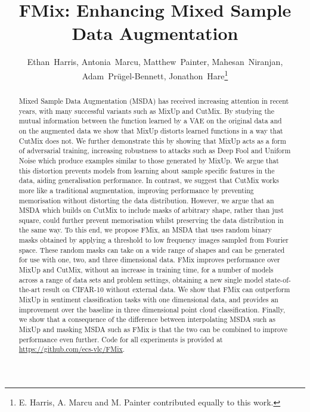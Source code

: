 \documentclass[journal]{IEEEtran}
\newcommand{\fmix}{FMix\xspace}
\newcommand{\mixup}{MixUp\xspace}
\newcommand{\cutmix}{CutMix\xspace}
\begin{document}
\title{FMix: Enhancing Mixed Sample Data Augmentation}


\author{Ethan~Harris,
        Antonia~Marcu,
        Matthew~Painter,
        Mahesan~Niranjan,
        Adam~Pr{\"u}gel-Bennett,
        Jonathon~Hare\thanks{E. Harris, A. Marcu and M. Painter contributed equally to this work.}}



















\maketitle

\begin{abstract}
Mixed Sample Data Augmentation (MSDA) has received increasing attention in recent years, with many successful variants such as \mixup and \cutmix.
By studying the mutual information between the function learned by a VAE on the original data and on the augmented data we show that \mixup distorts learned functions in a way that \cutmix does not.
We further demonstrate this by showing that \mixup acts as a form of adversarial training, increasing robustness to attacks such as Deep Fool and Uniform Noise which produce examples similar to those generated by \mixup.
We argue that this distortion prevents models from learning about sample specific features in the data, aiding generalisation performance.
In contrast, we suggest that \cutmix works more like a traditional augmentation, improving performance by preventing memorisation without distorting the data distribution.
However, we argue that an MSDA which builds on \cutmix to include masks of arbitrary shape, rather than just square, could further prevent memorisation whilst preserving the data distribution in the same way.
To this end, we propose \fmix, an MSDA that uses random binary masks obtained by applying a threshold to low frequency images sampled from Fourier space.
These random masks can take on a wide range of shapes and can be generated for use with one, two, and three dimensional data.
\fmix improves performance over \mixup and \cutmix, without an increase in training time, for a number of models across a range of data sets and problem settings, obtaining a new single model state-of-the-art result on CIFAR-10 without external data. We show that \fmix can outperform \mixup in sentiment classification tasks with one dimensional data, and provides an improvement over the baseline in three dimensional point cloud classification. Finally, we show that a consequence of the difference between interpolating MSDA such as \mixup and masking MSDA such as \fmix is that the two can be combined to improve performance even further.
Code for all experiments is provided at \url{https://github.com/ecs-vlc/FMix}.
\end{abstract}
\end{document}
